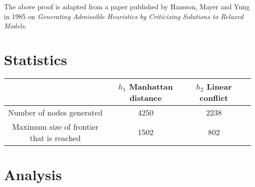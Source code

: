 \documentclass[11pt, a4paper]{article}
\begin{document}
The above proof is adapted from a paper published by Hansson, Mayer and Yung in 1985 on \textit{Generating Admissible Heuristics by Criticizing Solutions to Relaxed Models}.
\section{Statistics}
\begin{center}
\begin{tabular}{ |c|c|c|c| } 
\hline
 & $h_1$ Manhattan distance & $h_2$ Linear conflict \\
\hline
Number of nodes generated & 4250 & 2238 \\ 
Maximum size of frontier that is reached & 1502 & 802 \\ 
\hline
\end{tabular}
\end{center}


\section{Analysis}
\end{document}
